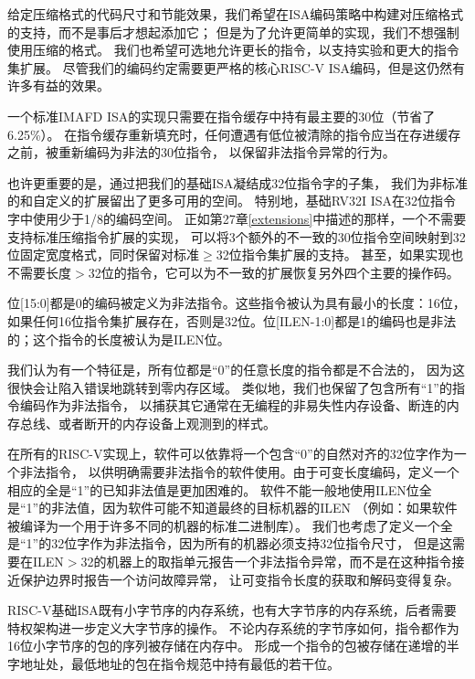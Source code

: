 \begin{commentary}
给定压缩格式的代码尺寸和节能效果，我们希望在ISA编码策略中构建对压缩格式的支持，而不是事后才想起添加它；
但是为了允许更简单的实现，我们不想强制使用压缩的格式。
我们也希望可选地允许更长的指令，以支持实验和更大的指令集扩展。
尽管我们的编码约定需要更严格的核心RISC-V ISA编码，但是这仍然有许多有益的效果。

一个标准IMAFD ISA的实现只需要在指令缓存中持有最主要的30位（节省了6.25\%）。
在指令缓存重新填充时，任何遭遇有低位被清除的指令应当在存进缓存之前，被重新编码为非法的30位指令，
以保留非法指令异常的行为。

也许更重要的是，通过把我们的基础ISA凝结成32位指令字的子集，
我们为非标准的和自定义的扩展留出了更多可用的空间。
特别地，基础RV32I ISA在32位指令字中使用少于1/8的编码空间。
正如第27章\ref{extensions}中描述的那样，一个不需要支持标准压缩指令扩展的实现，
可以将3个额外的不一致的30位指令空间映射到32位固定宽度格式，同时保留对标准$\geq$32位指令集扩展的支持。
甚至，如果实现也不需要长度$>$32位的指令，它可以为不一致的扩展恢复另外四个主要的操作码。
\end{commentary}

位[15:0]都是0的编码被定义为非法指令。这些指令被认为具有最小的长度：16位，
如果任何16位指令集扩展存在，否则是32位。位[ILEN-1:0]都是1的编码也是非法的；这个指令的长度被认为是ILEN位。

\begin{commentary}
我们认为有一个特征是，所有位都是“0”的任意长度的指令都是不合法的，
因为这很快会让陷入错误地跳转到零内存区域。
类似地，我们也保留了包含所有“1”的指令编码作为非法指令，
以捕获其它通常在无编程的非易失性内存设备、断连的内存总线、或者断开的内存设备上观测到的样式。

在所有的RISC-V实现上，软件可以依靠将一个包含“0”的自然对齐的32位字作为一个非法指令，
以供明确需要非法指令的软件使用。由于可变长度编码，定义一个相应的全是“1”的已知非法值是更加困难的。
软件不能一般地使用ILEN位全是“1”的非法值，因为软件可能不知道最终的目标机器的ILEN
（例如：如果软件被编译为一个用于许多不同的机器的标准二进制库）。
我们也考虑了定义一个全是“1”的32位字作为非法指令，因为所有的机器必须支持32位指令尺寸，
但是这需要在ILEN$>$32的机器上的取指单元报告一个非法指令异常，而不是在这种指令接近保护边界时报告一个访问故障异常，
让可变指令长度的获取和解码变得复杂。
\end{commentary}

RISC-V基础ISA既有小字节序的内存系统，也有大字节序的内存系统，后者需要特权架构进一步定义大字节序的操作。
不论内存系统的字节序如何，指令都作为16位小字节序的包的序列被存储在内存中。
形成一个指令的包被存储在递增的半字地址处，最低地址的包在指令规范中持有最低的若干位。

